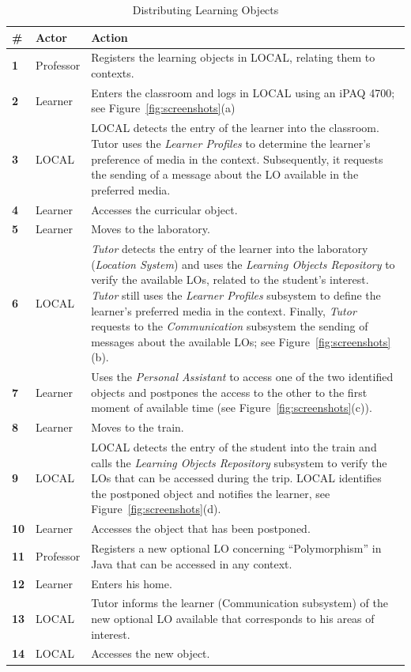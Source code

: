 \documentclass[5p,authoryear]{elsarticle}
\begin{document}
\begin{table}[h!]
  \footnotesize
  \begin{tabular}{p{0.12cm}p{1cm}p{5.9cm}}
    \toprule
    \# & Actor & Action \\
    \midrule
    \textbf{1} & Professor & Registers the learning objects in LOCAL, relating them to contexts.\\
    \midrule
    \textbf{2} & Learner & Enters the classroom and logs in LOCAL using an iPAQ 4700; see Figure~\ref{fig:screenshots}(a) \\
    \midrule
    \textbf{3} & LOCAL & LOCAL detects the entry of the learner into the classroom. Tutor uses the \emph{Learner Profiles} to determine the learner’s preference of media in the context. Subsequently, it requests the sending of a message about the LO available in the preferred media. \\
    \midrule
    \textbf{4} & Learner & Accesses the curricular object. \\
    \midrule
    \textbf{5} & Learner & Moves to the laboratory. \\
    \midrule
    \textbf{6} & LOCAL & \emph{Tutor} detects the entry of the learner into the laboratory (\emph{Location System}) and uses the \emph{Learning Objects Repository} to verify the available LOs, related to the student’s interest. \emph{Tutor} still uses the \emph{Learner Profiles} subsystem to define the learner’s preferred media in the context. Finally, \emph{Tutor} requests to the \emph{Communication} subsystem the sending of messages about the available LOs; see Figure~\ref{fig:screenshots}(b). \\
    \midrule
    \textbf{7} & Learner & Uses the \emph{Personal Assistant} to access one of the two identified objects and postpones the access to the other to the first moment of available time (see Figure~\ref{fig:screenshots}(c)). \\
    \midrule
    \textbf{8} & Learner & Moves to the train. \\
    \midrule
    \textbf{9} & LOCAL & LOCAL detects the entry of the student into the train and calls the \emph{Learning Objects Repository} subsystem to verify the LOs that can be accessed during the trip. LOCAL identifies the postponed object and notifies the learner, see Figure~\ref{fig:screenshots}(d). \\
    \midrule
    \textbf{10} & Learner & Accesses the object that has been postponed. \\
    \midrule
    \textbf{11} & Professor & Registers a new optional LO concerning ``Polymorphism'' in Java that can be accessed in any context. \\
    \midrule
    \textbf{12} & Learner & Enters his home. \\
    \midrule
    \textbf{13} & LOCAL & Tutor informs the learner (Communication subsystem) of the new optional LO available that corresponds to his areas of interest. \\
    \midrule
    \textbf{14} & LOCAL & Accesses the new object. \\
    \bottomrule
  \end{tabular}
  \caption{Distributing Learning Objects}
  \label{tab:distributing}
\end{table}
\end{document}
